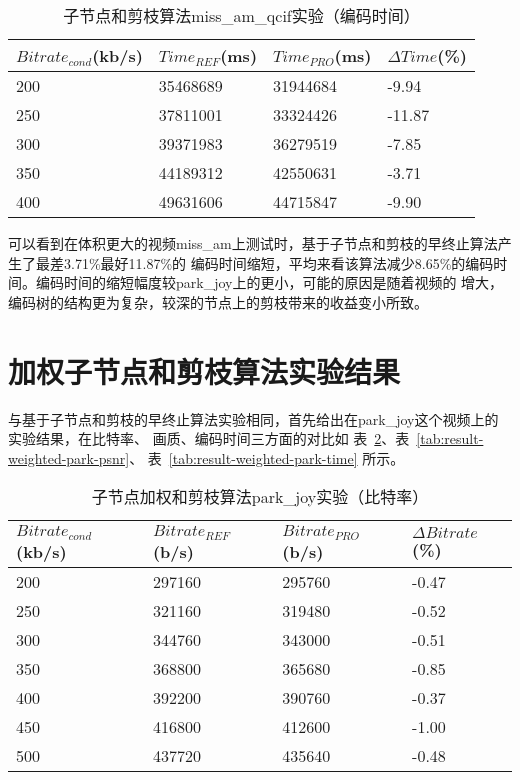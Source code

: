 \begin{table}[H]
  \centering
    \caption{子节点和剪枝算法miss\_am\_qcif实验（编码时间）}
    \label{tab:result-sum-miss-time}
    \begin{tabularx}{\linewidth}{XXXX}
      \toprule[1.5pt]
      $Bitrate_{cond}$(kb/s) & $Time_{REF}$(ms) & $Time_{PRO}$(ms) & $\Delta Time$(\%) \\
      \midrule[1pt]
      200 & 35468689 & 31944684 & -9.94 \\
      250 & 37811001 & 33324426 & -11.87 \\
      300 & 39371983 & 36279519 & -7.85 \\
      350 & 44189312 & 42550631 & -3.71 \\
      400 & 49631606 & 44715847 & -9.90 \\
      \bottomrule[1.5pt]
    \end{tabularx}
\end{table}

可以看到在体积更大的视频miss\_am上测试时，基于子节点和剪枝的早终止算法产生了最差3.71\%最好11.87\%的
编码时间缩短，平均来看该算法减少8.65\%的编码时间。编码时间的缩短幅度较park\_joy上的更小，可能的原因是随着视频的
增大，编码树的结构更为复杂，较深的节点上的剪枝带来的收益变小所致。


\section{加权子节点和剪枝算法实验结果}

与基于子节点和剪枝的早终止算法实验相同，首先给出在park\_joy这个视频上的实验结果，在比特率、
画质、编码时间三方面的对比如 表~\ref{tab:result-weighted-park-bitrate}、表~\ref{tab:result-weighted-park-psnr}、
表~\ref{tab:result-weighted-park-time} 所示。

\begin{table}[H]
  \caption{子节点加权和剪枝算法park\_joy实验（比特率）}
    \label{tab:result-weighted-park-bitrate}
    \begin{tabularx}{\linewidth}{XXXX}
      \toprule[1.5pt]
      $Bitrate_{cond}$(kb/s) & $Bitrate_{REF}$(b/s) & $Bitrate_{PRO}$(b/s) & $\Delta Bitrate$(\%) \\
      \midrule[1pt]
      200 & 297160 & 295760 & -0.47  \\
      250 & 321160 & 319480 & -0.52 \\
      300 & 344760 & 343000 & -0.51  \\
      350 & 368800 & 365680 & -0.85 \\
      400 & 392200 & 390760 & -0.37  \\
      450 & 416800 & 412600 & -1.00 \\
      500 & 437720 & 435640 & -0.48  \\
      \bottomrule[1.5pt]
    \end{tabularx}
\end{table}

